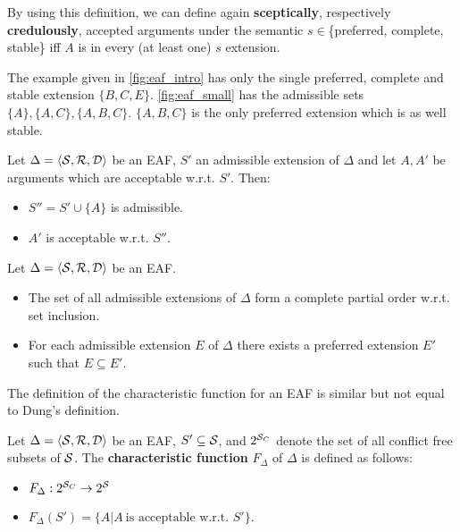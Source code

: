 By using this definition, we can define again \textbf{sceptically}, respectively \textbf{credulously}, accepted arguments under the semantic $ s \in $\{preferred, complete, stable\} iff $A$ is in every (at least one) $s$ extension. 
\begin{exa}
	The example given in \autoref{fig:eaf_intro} has only the single preferred, complete and stable extension $\{B, C, E\}$. \autoref{fig:eaf_small} has the admissible sets $\{A\}, \{A, C\}, \{A, B, C\}$. $\{A, B, C\}$ is the only preferred extension which is as well stable.
\end{exa}


\begin{lemma}
	Let $\Delta = \langle \S, \R, \D \rangle$ be an \gls{EAF}, $S'$ an admissible extension of $\Delta$ and let $A, A'$ be arguments which are acceptable w.r.t. $S'$. Then:
	\begin{itemize}
		\item $S'' = S' \cup \{A\}$ is admissible.
		\item $A'$ is acceptable w.r.t. $S''$.
	\end{itemize}	
\end{lemma}

\begin{lemma}
	Let $\Delta = \langle \S, \R, \D \rangle$ be an \gls{EAF}. 
	\begin{itemize}
		\item The set of all admissible extensions of $\Delta$ form a complete partial order w.r.t. set inclusion.
		\item For each admissible extension $E$ of $\Delta$ there exists a preferred extension $E'$ such that $E\subseteq E'$.
	\end{itemize}
	\label{lem:eaf:partialorder}
\end{lemma}

The definition of the characteristic function for an \gls{EAF} is similar but not equal to Dung's definition. 

\begin{definition}
	Let $\Delta = \langle \S, \R, \D \rangle$ be an \gls{EAF}, $S'\subseteq \S$, and $2^{\S_C}$ denote the set of all conflict free subsets of $\S$. The \textbf{characteristic function} $F_\Delta$ of $\Delta$ is defined as follows:
	\begin{itemize}
		\item $F_\Delta: 2^{\S_C} \rightarrow 2^{\S}$
		\item $F_\Delta(S') = \{A | A~\text{is acceptable w.r.t.~}S'\}$.
	\end{itemize}
\end{definition}


